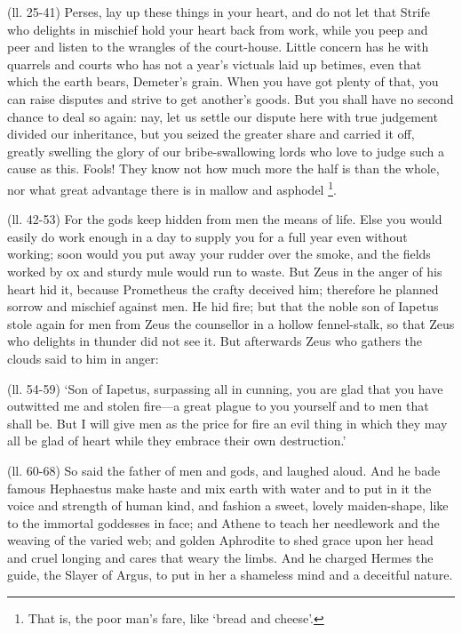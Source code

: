 (ll. 25-41) Perses, lay up these things in your heart, and do not let that
Strife who delights in mischief hold your heart back from work, while you peep
and peer and listen to the wrangles of the court-house. Little concern has he
with quarrels and courts who has not a year’s victuals laid up betimes,
even that which the earth bears, Demeter’s grain. When you have got
plenty of that, you can raise disputes and strive to get another’s goods.
But you shall have no second chance to deal so again: nay, let us settle our
dispute here with true judgement divided our inheritance, but you seized the
greater share and carried it off, greatly swelling the glory of our
bribe-swallowing lords who love to judge such a cause as this. Fools! They know
not how much more the half is than the whole, nor what great advantage there is
in mallow and asphodel \footnote{That is, the poor
man’s fare, like ‘bread and cheese’.}.

(ll. 42-53) For the gods keep hidden from men the means of life. Else you would
easily do work enough in a day to supply you for a full year even without
working; soon would you put away your rudder over the smoke, and the fields
worked by ox and sturdy mule would run to waste. But Zeus in the anger of his
heart hid it, because Prometheus the crafty deceived him; therefore he planned
sorrow and mischief against men. He hid fire; but that the noble son of Iapetus
stole again for men from Zeus the counsellor in a hollow fennel-stalk, so that
Zeus who delights in thunder did not see it. But afterwards Zeus who gathers
the clouds said to him in anger:

(ll. 54-59) ‘Son of Iapetus, surpassing all in cunning, you are glad that
you have outwitted me and stolen fire—a great plague to you yourself and
to men that shall be. But I will give men as the price for fire an evil thing
in which they may all be glad of heart while they embrace their own
destruction.’

(ll. 60-68) So said the father of men and gods, and laughed aloud. And he bade
famous Hephaestus make haste and mix earth with water and to put in it the
voice and strength of human kind, and fashion a sweet, lovely maiden-shape,
like to the immortal goddesses in face; and Athene to teach her needlework and
the weaving of the varied web; and golden Aphrodite to shed grace upon her head
and cruel longing and cares that weary the limbs. And he charged Hermes the
guide, the Slayer of Argus, to put in her a shameless mind and a deceitful
nature.

